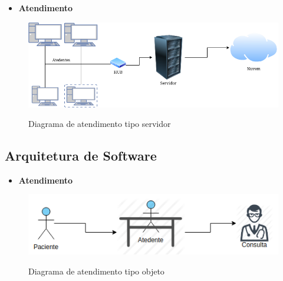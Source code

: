              \begin{itemize}
             
    \item \textbf{Atendimento}
  \end{itemize}
\begin{figure}[H]
              \begin{center}
                  \caption{Diagrama de atendimento tipo servidor} \label{afp}
                  \includegraphics[width=15cm]{Pictures/DiagramaAtendimentoTipoServidor.png} \\

              \end{center}
             \end{figure}




    \subsection{Arquitetura de Software}
    

 \begin{itemize}
 
    \item \textbf{Atendimento}
  \end{itemize}
\begin{figure}[H]
              \begin{center}
                  \caption{Diagrama de atendimento tipo objeto} \label{afp}
                  \includegraphics[width=15cm]{Pictures/DiagramaAtendimentoTipoObjeto.png} \\

              \end{center}
             \end{figure}

